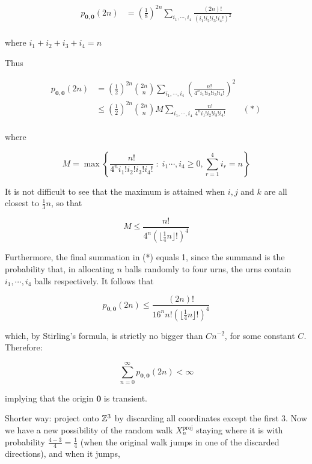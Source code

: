 \documentclass[a4paper]{article}
\begin{document}
\begin{align*}
p_{\mathbf{0},\mathbf{0}}(2n) & = \left(  \frac{1}{8} \right)^{2n} \sum_{i_{1},\cdots,i_{4}} \frac{(2n)!}{(i_{1}!i_{2}!i_{3}!i_{4}!)^{2}}   \\
\end{align*}

where $ i_{1} + i_{2} + i_{3} + i_{4} = n $

Thus

\begin{align*}
p_{\mathbf{0},\mathbf{0}}(2n)& = \left( \frac{1}{2} \right)^{2n} \binom{2n}{n} \sum_{i_{1},\cdots,i_{4}} \left( \frac{n!}{4^{n}i_{1}!i_{2}!i_{3}!i_{4}!}   \right)^{2}   \\
& \leq \left( \frac{1}{2} \right)^{2n} \binom{2n}{n} M \sum_{i_{1},\cdots,i_{4}} \frac{n!}{4^{n}i_{1}!i_{2}!i_{3}!i_{4}!}  \qquad (*) \\
\end{align*}

where

\[ M = \max \left\{  \frac{n!}{4^{n}i_{1}!i_{2}!i_{3}!i_{4}!} \; : \; i_{1}\cdots,i_{4}  \geq 0, \sum_{r=1}^{4} i_{r} = n   \right\}  \]

It is not difficult to see that the maximum is attained when $ i,j $ and $ k $ are all closest to $ \frac{1}{3}n $, so that

\[ M \leq \frac{n!}{4^{n}( \lfloor \frac{1}{4} n \rfloor ! )^{4}   } \]

Furthermore, the final summation in (*) equals 1, since the summand is the probability that, in allocating $ n $ balls randomly to four urns, the urns contain $ i_{1},\cdots,i_{4} $ balls respectively. It follows that

\[ p_{\mathbf{0},\mathbf{0}}(2n) \leq \frac{(2n)!}{16^{n}n! ( \lfloor \frac{1}{4}n \rfloor ! )^{4}   } \]

which, by Stirling's formula, is strictly no bigger than $ C n^{-2} $, for some constant $ C $. Therefore:

\[ \sum_{n=0}^{\infty} p_{\mathbf{0},\mathbf{0}}(2n) < \infty  \]

implying that the origin $ \mathbf{0} $ is transient.

Shorter way: project onto $ \mathbb{Z}^{3} $ by discarding all coordinates except the first 3. Now we have a new possibility of the random walk $ X_{n}^{\text{proj}} $ staying where it is with probability $ \frac{4-3}{4} = \frac{1}{4} $ (when the original walk jumps in one of the discarded directions), and when it jumps,
\end{document}
